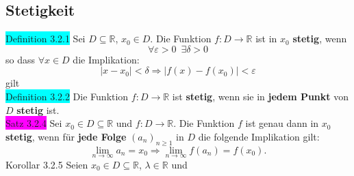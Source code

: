 \documentclass[landscape, 10pt]{article}
\newcommand{\R}{\mathbb{R}}
\begin{document}
\begin{multicols}{3}
       \subsection{Stetigkeit}
              \colorbox{cyan}{Definition 3.2.1} 
                     Sei \textcolor{NavyBlue}{$D\subseteq\R$},
                     \textcolor{NavyBlue}{$x_0\in D$}. 
                     Die Funktion 
                     \textcolor{NavyBlue}{$f:D\longrightarrow\R$} 
                     ist in $x_0$ \textbf{stetig}, wenn 
                     \begin{equation*}
                            \forall\varepsilon>0
                            \enspace\exists\delta>0
                     \end{equation*}
                     so dass 
                     \textcolor{NavyBlue}{$\forall x\in D$} 
                     die Implikation:
                     \begin{equation*}
                            |x-x_0|<\delta\Rightarrow|f(x)-f(x_0)|<\varepsilon
                     \end{equation*}
                     gilt\\
              \colorbox{cyan}{Definition 3.2.2} 
                     Die Funktion \textcolor{NavyBlue}{$f:D\longrightarrow\R$}
                     ist \textbf{stetig}, wenn sie in 
                     \textbf{jedem Punkt} von 
                     \textcolor{NavyBlue}{$D$} 
                     \textbf{stetig} ist.\\
              \colorbox{magenta}{Satz 3.2.4} Sei 
                     \textcolor{NavyBlue}{$x_0\in D\subseteq\R$} und 
                     \textcolor{NavyBlue}{$f:D\longrightarrow\R$}. 
                     Die Funktion \textcolor{NavyBlue}{$f$} ist genau 
                     dann in \textcolor{NavyBlue}{$x_0$} 
                     \textbf{stetig}, wenn für 
                     \textbf{jede Folge} 
                     \textcolor{NavyBlue}{$(a_n)_{n\geqslant1}$} 
                     in \textcolor{NavyBlue}{$D$}
                     die folgende Implikation gilt: 
                     \begin{equation*}
                            \lim\limits_{n\to\infty}a_n=x_0\Longrightarrow
                            \lim\limits_{n\to\infty}f(a_n)=f(x_0). 
                     \end{equation*}
              \colorbox{BurntOrange}{Korollar 3.2.5} Seien 
                     \textcolor{NavyBlue}{$x_0\in D\subseteq\R$},
                     \textcolor{NavyBlue}{$\lambda\in\R$} und \\

\end{multicols}
\end{document}
